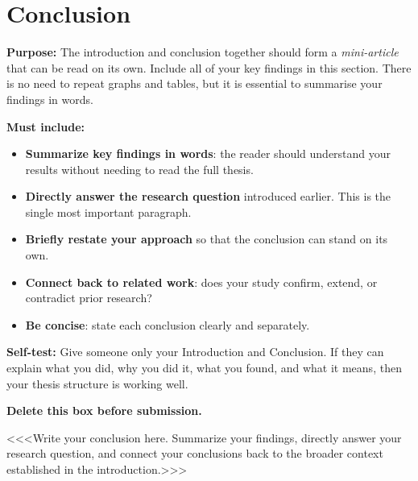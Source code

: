 \documentclass[12pt,a4paper,twocolumn]{article}
\begin{document}
\section{Conclusion}
\label{sec:conclusion}

\begin{guidancebox}
\textbf{Purpose:} The introduction and conclusion together should form a
\emph{mini-article} that can be read on its own. Include all of your key
findings in this section. There is no need to repeat graphs and tables,
but it is essential to summarise your findings in words.

\textbf{Must include:}
\begin{itemize}[leftmargin=*, nosep]
  \item \textbf{Summarize key findings in words}: the reader should
    understand your results without needing to read the full thesis.
  \item \textbf{Directly answer the research question} introduced earlier.
    This is the single most important paragraph.
  \item \textbf{Briefly restate your approach} so that the conclusion can
    stand on its own.
  \item \textbf{Connect back to related work}: does your study confirm,
    extend, or contradict prior research?
  \item \textbf{Be concise}: state each conclusion clearly and separately.
\end{itemize}

\textbf{Self-test:} Give someone only your Introduction and Conclusion.
If they can explain what you did, why you did it, what you found, and what
it means, then your thesis structure is working well.

\textbf{Delete this box before submission.}
\end{guidancebox}

\noindent
<<<Write your conclusion here. Summarize your findings, directly answer your
research question, and connect your conclusions back to the broader context
established in the introduction.>>>


\end{document}

